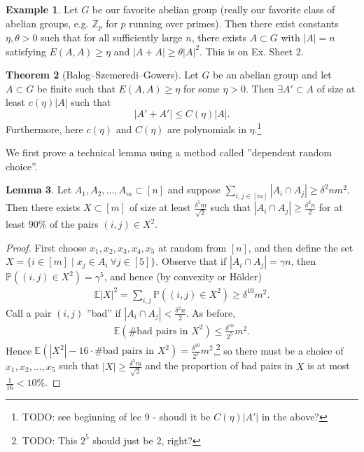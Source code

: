 \documentclass{article}
\theoremstyle{definition}
\newtheorem{theorem}{Theorem}[section]
\newtheorem{lemma}[theorem]{Lemma}
\newtheorem{example}[theorem]{Example}
\begin{document}
\begin{example}
    Let $G$ be our favorite abelian group (really our favorite class of abelian groups, e.g. $\mathbb{Z}_p$ for $p$ running over primes). Then there exist constants $\eta,\theta>0$ such that for all sufficiently large $n$, there exists $A \subset G$ with $\left|A\right| = n$ satisfying $E(A,A) \ge \eta$ and $\left|A+A\right|\ge \theta \left|A\right|^2$. This is on Ex. Sheet 2.
\end{example}
\begin{theorem}[Balog--Szemeredi--Gowers]\label{theorem2.15}
    Let $G$ be an abelian group and let $A \subset G$ be finite such that $E(A,A) \ge \eta$ for some $\eta >0$. Then $\exists A' \subset A$ of size at least $c(\eta)\left|A\right|$ such that $$\left|A'+A'\right| \le C(\eta)\left|A\right|.$$
    Furthermore, here $c(\eta)$ and $C(\eta)$ are polynomials in $\eta$.\footnote{TODO: see beginning of lec 9 - shoudl it be $C(\eta)\left|A'\right|$ in the above?}
\end{theorem}
We first prove a technical lemma using a method called ''dependent random choice''. 
\begin{lemma}\label{lemma2.16}
    Let $A_1,A_2,\ldots,A_m \subset [n]$ and suppose $\sum_{i,j \in [m]}^{} \left|A_i \cap A_j\right|\ge \delta^2 nm^2$. Then there exists $X \subset [m]$ of size at least $\frac{\delta^5 m}{\sqrt{2}}$ such that $\left|A_i \cap A_j\right|\ge \frac{\delta^2n}{2}$ for at least $90\%$ of the pairs $(i,j) \in X^2$.
\end{lemma}
\begin{proof}
    First choose $x_1,x_2,x_3,x_4,x_5$ at random from $[n]$, and then define the set $X = \{i \in [m] \mid x_j \in A_i ~\forall j \in [5]\}$. Observe that if $\left|A_i \cap A_j\right| = \gamma n$, then $\mathbb{P}\left((i,j) \in X^2\right) = \gamma^5$, and hence (by convexity or Hölder)
    \begin{align*}
        \mathbb{E}\left|X\right|^2 = \sum_{i,j}^{} \mathbb{P}\left((i,j)\in X^2\right) \ge \delta^{10}m^2.
    \end{align*}
    Call a pair $(i,j)$ ''bad'' if $\left|A_i \cap A_j\right| < \frac{\delta^2 n}{2}$. As before,
    \begin{align*}
        \mathbb{E}(\# \text{bad pairs in }X^2) \le \frac{\delta^{10}}{2^5}m^2.
    \end{align*}
    Hence $\mathbb{E}\left(\left|X^2\right| - 16 \cdot \# \text{bad pairs in }X^2\right)=\frac{\delta^{10}}{2^5}m^2$,\footnote{TODO: This $2^5$ should just be $2$, right?} so there must be a choice of $x_1,x_2,\ldots,x_5$ such that $\left|X\right| \ge  \frac{\delta^5 m}{\sqrt{2}}$ and the proportion of bad pairs in $X$ is at most $\frac{1}{16}< 10\%$.
\end{proof}
\end{document}
